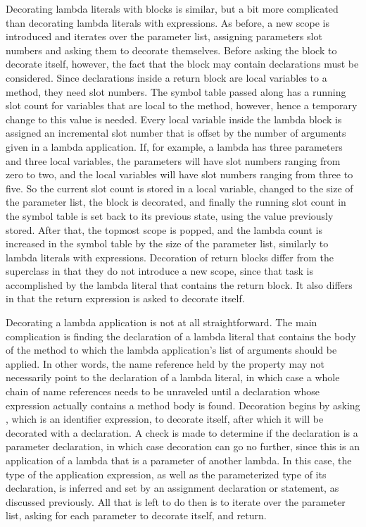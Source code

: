 Decorating lambda literals with blocks is similar, but a bit more complicated than decorating lambda literals with expressions. As before, a new scope is introduced and  iterates over the parameter list, assigning parameters slot numbers and asking them to decorate themselves. Before asking the block to decorate itself, however, the fact that the block may contain declarations must be considered. Since declarations inside a return block are local variables to a method, they need slot numbers. The symbol table passed along has a running slot count for variables that are local to the  method, however, hence a temporary change to this value is needed. Every local variable inside the lambda block is assigned an incremental slot number that is offset by the number of arguments given in a lambda application. If, for example, a lambda has three parameters and three local variables, the parameters will have slot numbers ranging from zero to two, and the local variables will have slot numbers ranging from three to five. So the current slot count is stored in a local variable, changed to the size of the parameter list, the block is decorated, and finally the running slot count in the symbol table is set back to its previous state, using the value previously stored. After that, the topmost scope is popped, and the lambda count is increased in the symbol table by the size of the parameter list, similarly to lambda literals with expressions. Decoration of return blocks differ from the  superclass in that they do not introduce a new scope, since that task is accomplished by the lambda literal that contains the return block. It also differs in that the return expression is asked to decorate itself.

Decorating a lambda application is not at all straightforward. The main complication is finding the declaration of a lambda literal that contains the body of the method to which the lambda application's list of arguments should be applied. In other words, the name reference held by the  property may not necessarily point to the declaration of a lambda literal, in which case a whole chain of name references needs to be unraveled until a declaration whose expression actually contains a method body is found. Decoration begins by asking , which is an identifier expression, to decorate itself, after which it will be decorated with a declaration. A check is made to determine if the declaration is a parameter declaration, in which case decoration can go no further, since this is an application of a lambda that is a parameter of another lambda. In this case, the type of the application expression, as well as the parameterized type of its declaration, is inferred and set by an assignment declaration or statement, as discussed previously. All that is left to do then is to iterate over the parameter list, asking for each parameter to decorate itself, and return.

